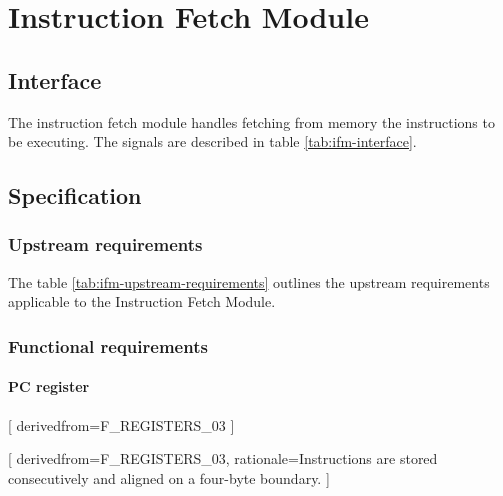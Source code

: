 \section{Instruction Fetch Module}

  \subsection{Interface}

    \begin{content}
        The instruction fetch module handles fetching from memory the instructions to be executing. The signals are described in table \ref{tab:ifm-interface}. 
      \end{content}

    

  \subsection{Specification}

    \subsubsection{Upstream requirements}

      The table \ref{tab:ifm-upstream-requirements} outlines the upstream requirements applicable to the Instruction Fetch Module.

      

    \subsubsection{Functional requirements}

      \paragraph{PC register}

      [
          derivedfrom=F\_REGISTERS\_03
        ]

      [
          derivedfrom=F\_REGISTERS\_03,
          rationale=Instructions are stored consecutively and aligned on a four-byte boundary.
        ]

